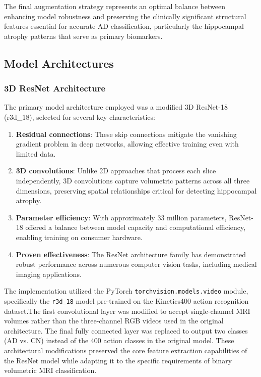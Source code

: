 \documentclass[12pt, a4paper]{article}
\begin{document}
The final augmentation strategy represents an optimal balance between enhancing model robustness and preserving the clinically significant structural features essential for accurate AD classification, particularly the hippocampal atrophy patterns that serve as primary biomarkers.

\subsection{Model Architectures}
\subsubsection{3D ResNet Architecture}

The primary model architecture employed was a modified 3D ResNet-18 (r3d\_18), selected for several key characteristics:

\begin{enumerate}
    \item \textbf{Residual connections}: These skip connections mitigate the vanishing gradient problem in deep networks, allowing effective training even with limited data.
    
    \item \textbf{3D convolutions}: Unlike 2D approaches that process each slice independently, 3D convolutions capture volumetric patterns across all three dimensions, preserving spatial relationships critical for detecting hippocampal atrophy.
    
    \item \textbf{Parameter efficiency}: With approximately 33 million parameters, ResNet-18 offered a balance between model capacity and computational efficiency, enabling training on consumer hardware.
    
    \item \textbf{Proven effectiveness}: The ResNet architecture family has demonstrated robust performance across numerous computer vision tasks, including medical imaging applications.
\end{enumerate}


The implementation utilized the PyTorch \texttt{torchvision.models.video} module, specifically the \texttt{r3d\_18} model pre-trained on the Kinetics400 action recognition dataset.The first convolutional layer was modified to accept single-channel MRI volumes rather than the three-channel RGB videos used in the original architecture. The final fully connected layer was replaced to output two classes (AD vs. CN) instead of the 400 action classes in the original model. These architectural modifications preserved the core feature extraction capabilities of the ResNet model while adapting it to the specific requirements of binary volumetric MRI classification.
\end{document}

